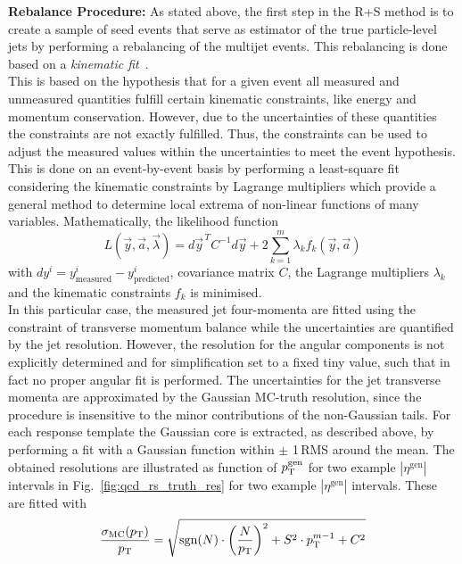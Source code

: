 \begin{description}
 \item \textbf{Rebalance Procedure:}
As stated above, the first step in the R+S method is to create a sample of seed events that serve as estimator of the true particle-level jets by performing a rebalancing of the multijet events. This rebalancing is done based on a \textit{kinematic fit}~\cite{D'Hondt:926540}. \\
This is based on the hypothesis that for a given event all measured and unmeasured quantities fulfill certain kinematic constraints, like energy and momentum conservation. However, due to the uncertainties of these quantities the constraints are not exactly fulfilled. Thus, the constraints can be used to adjust the measured values within the uncertainties to meet the event hypothesis. This is done on an event-by-event basis by performing a least-square fit considering the kinematic constraints by Lagrange multipliers which provide a general method to determine local extrema of non-linear functions of many variables. Mathematically, the likelihood function 
\begin{equation}
L(\vec{y}, \vec{a}, \vec{\lambda}) = d\vec{y}^{\,T} C^{-1} d \vec{y} + 2 \sum_{k=1}^{m} \lambda_{k} f_k(\vec{y}, \vec{a})
\end{equation}
with $dy^i = y_{\mathrm{measured}}^i - y_{\mathrm{predicted}}^i$, covariance matrix $C$, the Lagrange multipliers $\lambda_k$ and the kinematic constraints $f_k$ is minimised. \\
In this particular case, the measured jet four-momenta are fitted using the constraint of transverse momentum balance while the uncertainties are quantified by the jet resolution. However, the resolution for the angular components is not explicitly determined and for simplification set to a fixed tiny value, such that in fact no proper angular fit is performed. The uncertainties for the jet transverse momenta are approximated by the Gaussian MC-truth resolution, since the procedure is insensitive to the minor contributions of the non-Gaussian tails. For each response template the Gaussian core is extracted, as described above, by performing a fit with a Gaussian function within $\pm$ 1\,RMS around the mean. The obtained resolutions are illustrated as function of $p_{\text{T}}^\mathrm{gen}$ for two example $|\eta^\mathrm{gen}|$ intervals in Fig.~\ref{fig:qcd_rs_truth_res} for two example $|\eta^\mathrm{gen}|$ intervals. These are fitted with
\begin{equation}
\frac{\sigma_\mathrm{MC}(\pt)}{\pt} = \sqrt{\mathrm{sgn}(N) \cdot \left(\frac{N}{\pt}\right)^2 + S^2 \cdot \pt^{m-1} + C^2}

\end{equation}
\end{description}
